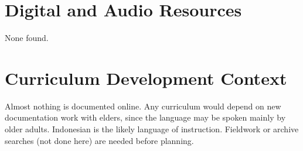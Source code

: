 \documentclass[12pt]{article}
\begin{document}
\section{Digital and Audio Resources}
None found.

\section{Curriculum Development Context}
Almost nothing is documented online. Any curriculum would depend on new documentation work with elders, since the language may be spoken mainly by older adults. Indonesian is the likely language of instruction. Fieldwork or archive searches (not done here) are needed before planning.
\end{document}
